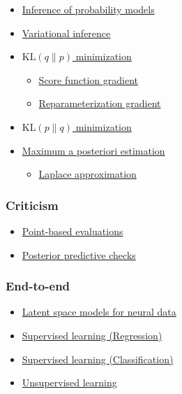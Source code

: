 \begin{itemize}
  \item \href{tut_inference.html}{Inference of probability models}
  \item \href{tut_variational_inference.html}{Variational inference}
  \item \href{tut_KLqp.html}{$\text{KL}(q\|p)$ minimization}
  \begin{itemize}
    \item \href{tut_KLqp_score.html}{Score function gradient}
    \item \href{tut_KLqp_reparam.html}{Reparameterization gradient}
  \end{itemize}
  \item \href{tut_KLpq.html}{$\text{KL}(p\|q)$ minimization}
  \item \href{tut_MAP.html}{Maximum a posteriori estimation}
  \begin{itemize}
    \item \href{tut_MAP_Laplace.html}{Laplace approximation}
  \end{itemize}
\end{itemize}

\subsubsection{Criticism}

\begin{itemize}
  \item \href{tut_point_eval.html}{Point-based evaluations}
  \item \href{tut_PPC.html}{Posterior predictive checks}
\end{itemize}

\subsubsection{End-to-end}

\begin{itemize}
  \item \href{tut_latent_space_models.html}{Latent space models for neural data}
  \item \href{tut_supervised_regression.html}{Supervised learning (Regression)}
  \item \href{tut_supervised_classification.html}{Supervised learning (Classification)}
  \item \href{tut_unsupervised.html}{Unsupervised learning}
\end{itemize}
